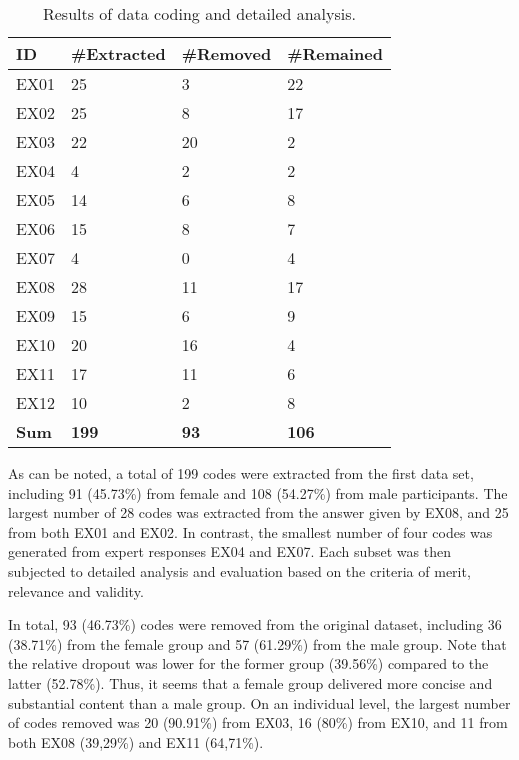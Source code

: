 \documentclass[preprint,12pt,number]{elsarticle}
\begin{document}
\begin{table}[h]
\caption{Results of data coding and detailed analysis.}
\label{tab:data-coding-RQ1}
\footnotesize
\centering
\begin{tabular}{|l|l|l|l|}
\hline
\textbf{ID}    & \textbf{\#Extracted} & \textbf{\#Removed} & \textbf{\#Remained} \\ \hline
EX01 & 25          & 3         & 22         \\ \hline
EX02 & 25          & 8         & 17         \\ \hline
EX03 & 22          & 20        & 2          \\ \hline
EX04 & 4           & 2         & 2          \\ \hline
EX05 & 14          & 6         & 8          \\ \hline
EX06 & 15          & 8         & 7          \\ \hline
EX07 & 4           & 0         & 4          \\ \hline
EX08 & 28          & 11        & 17         \\ \hline
EX09 & 15          & 6         & 9          \\ \hline
EX10 & 20          & 16        & 4          \\ \hline
EX11 & 17          & 11        & 6          \\ \hline
EX12 & 10          & 2         & 8          \\ \hline
\textbf{Sum}   & \textbf{199 }        & \textbf{93}        & \textbf{106}        \\ \hline
\end{tabular}
\end{table}

As can be noted, a total of 199 codes were extracted from the first data set, including 91 (45.73\%) from female and 108 (54.27\%) from male participants. The largest number of 28 codes was extracted from the answer given by EX08, and 25 from both EX01 and EX02. In contrast, the smallest number of four codes was generated from expert responses EX04 and EX07. Each subset was then subjected to detailed analysis and evaluation based on the criteria of merit, relevance and validity. 

In total, 93 (46.73\%) codes were removed from the original dataset, including 36 (38.71\%) from the female group and 57 (61.29\%) from the male group. Note that the relative dropout was lower for the former group (39.56\%) compared to the latter (52.78\%). Thus, it seems that a female group delivered more concise and substantial content than a male group.
On an individual level, the largest number of codes removed was 20 (90.91\%) from EX03, 16 (80\%) from EX10, and 11 from both EX08 (39,29\%) and EX11 (64,71\%). 
\end{document}
